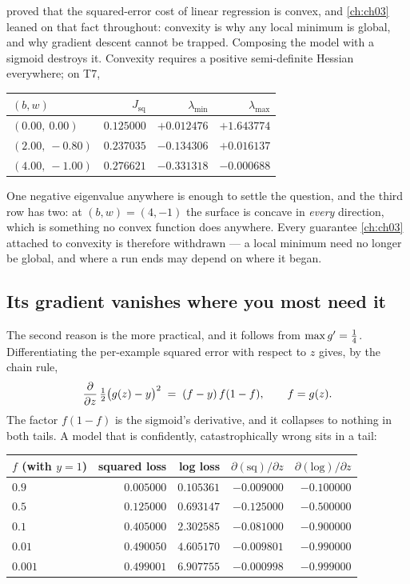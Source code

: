  proved that the squared-error cost of linear regression is
convex, and \cref{ch:ch03} leaned on that fact throughout: convexity is why any
local minimum is global, and why gradient descent cannot be trapped. Composing
the model with a sigmoid destroys it. Convexity requires a positive
semi-definite Hessian everywhere; on T7,
\begin{center}
\small
\renewcommand{\arraystretch}{1.2}
\begin{tabular}{@{}lrrr@{}}
\toprule
$(b,w)$ & $J_{\mathrm{sq}}$ & $\lambda_{\min}$ & $\lambda_{\max}$\\
\midrule
$(0.00,\ 0.00)$  & $0.125000$ & $+0.012476$ & $+1.643774$\\
$(2.00,\ -0.80)$ & $0.237035$ & $-0.134306$ & $+0.016137$\\
$(4.00,\ -1.00)$ & $0.276621$ & $-0.331318$ & $-0.000688$\\
\bottomrule
\end{tabular}
\end{center}
One negative eigenvalue anywhere is enough to settle the question, and the third
row has two: at $(b,w) = (4,-1)$ the surface is concave in \emph{every}
direction, which is something no convex function does anywhere. Every guarantee
\cref{ch:ch03} attached to convexity is therefore withdrawn --- a local minimum
need no longer be global, and where a run ends may depend on where it began.

\subsection{Its gradient vanishes where you most need it}

The second reason is the more practical, and it follows from
$\max g' = \tfrac14$. Differentiating the per-example squared error with
respect to $z$ gives, by the chain rule,
\[
  \frac{\partial}{\partial z}\,\tfrac12\bigl(g(z)-y\bigr)^2
  \;=\; (f - y)\,f(1-f), \qquad f = g(z).
\]
The factor $f(1-f)$ is the sigmoid's derivative, and it collapses to nothing in
both tails. A model that is confidently, catastrophically wrong sits in a tail:

\begin{center}
\small
\renewcommand{\arraystretch}{1.2}
\begin{tabular}{@{}lrrrr@{}}
\toprule
$f$ (with $y=1$) & squared loss & log loss
                 & $\partial(\text{sq})/\partial z$
                 & $\partial(\text{log})/\partial z$\\
\midrule
$0.9$   & $0.005000$ & $0.105361$ & $-0.009000$ & $-0.100000$\\
$0.5$   & $0.125000$ & $0.693147$ & $-0.125000$ & $-0.500000$\\
$0.1$   & $0.405000$ & $2.302585$ & $-0.081000$ & $-0.900000$\\
$0.01$  & $0.490050$ & $4.605170$ & $-0.009801$ & $-0.990000$\\
$0.001$ & $0.499001$ & $6.907755$ & $-0.000998$ & $-0.999000$\\
\bottomrule
\end{tabular}
\end{center}

